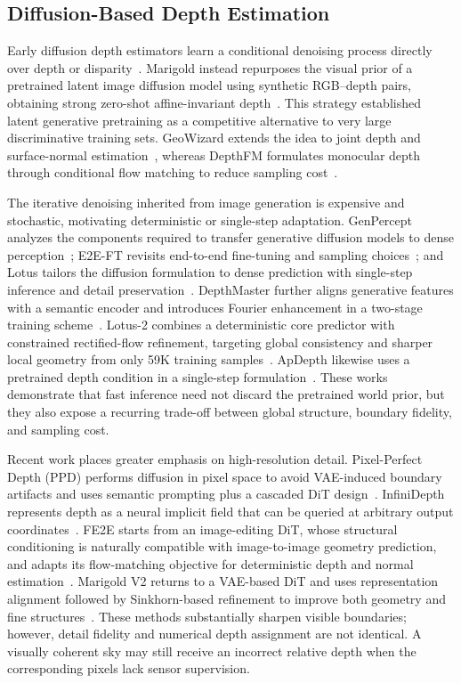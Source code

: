 \documentclass[10pt,journal,a4paper]{IEEEtran}
\begin{document}
\subsection{Diffusion-Based Depth Estimation}
Early diffusion depth estimators learn a conditional denoising process directly over depth or disparity~\cite{saxena2023depthgen,duan2023diffusiondepth}.
 Marigold instead repurposes the visual prior of a pretrained latent image diffusion model using synthetic RGB--depth pairs, obtaining strong zero-shot 
 affine-invariant depth~\cite{ke2024repurposing,Ke2025Marigold}. This strategy established latent generative pretraining as a competitive alternative to 
 very large discriminative training sets. GeoWizard extends the idea to joint depth and surface-normal estimation~\cite{fu2025geowizard}, whereas DepthFM 
 formulates monocular depth through conditional flow matching to reduce sampling cost~\cite{gui2024depthfm}.

The iterative denoising inherited from image generation is expensive and stochastic, motivating deterministic or single-step adaptation. GenPercept analyzes the 
components required to transfer generative diffusion models to dense perception~\cite{xu2024genpercept}; E2E-FT revisits end-to-end fine-tuning and sampling choices~\cite{garcia2025fine};
 and Lotus tailors the diffusion formulation to dense prediction with single-step inference and detail preservation~\cite{he2025lotus}. DepthMaster further aligns generative features with 
 a semantic encoder and introduces Fourier enhancement in a two-stage training scheme~\cite{song2026depthmaster}. Lotus-2 combines a deterministic core predictor with constrained rectified-flow 
 refinement, targeting global consistency and sharper local geometry from only 59K training samples~\cite{he2025lotus2}. ApDepth likewise uses a pretrained depth condition in a single-step 
 formulation~\cite{wang2026apdepth}. These works demonstrate that fast inference need not discard the pretrained world prior, 
 but they also expose a recurring trade-off between global structure, boundary fidelity, and sampling cost.

Recent work places greater emphasis on high-resolution detail. Pixel-Perfect Depth (PPD) performs diffusion in pixel space to avoid VAE-induced boundary 
artifacts and uses semantic prompting plus a cascaded DiT design~\cite{xu2025pixel}. InfiniDepth represents depth as a neural implicit field that can be queried 
at arbitrary output coordinates~\cite{yu2026infinidepth}. FE2E starts from an image-editing DiT, whose structural conditioning is naturally compatible with image-to-image 
geometry prediction, and adapts its flow-matching objective for deterministic depth and normal estimation~\cite{wang2026fe2e}. Marigold V2 returns to a VAE-based DiT and uses 
representation alignment followed by Sinkhorn-based refinement to improve both geometry and fine structures~\cite{pavlovic2026marigoldv2}. 
These methods substantially sharpen visible boundaries; however, detail fidelity and numerical depth assignment are not identical.
 A visually coherent sky may still receive an incorrect relative depth when the corresponding pixels lack sensor supervision.
\end{document}
